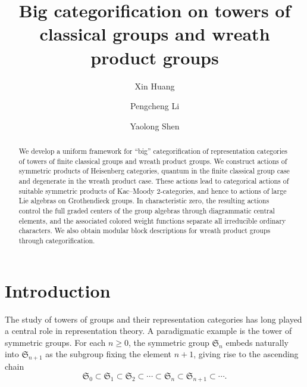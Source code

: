 \documentclass[12pt]{amsart}
\numberwithin{itemcounter}{subsection}
\theoremstyle{plain}
\theoremstyle{definition}
\theoremstyle{remark}
\numberwithin{equation}{section}
\begin{document}
	\title{Big categorification on towers of classical groups and wreath product groups}

    \author{Xin Huang}
\address[Xin Huang]{School of Mathematics and Statistics, Central China Normal University, Wuhan 430079, China}

    \author{Pengcheng Li}
\address[Pengcheng Li]{Department of Mathematics and New Cornerstone Science Laboratory, The University of Hong Kong, Hong Kong}

	\author{Yaolong Shen}
\address[Yaolong Shen]{School of Mathematical Sciences, Key Laboratory of MEA (Ministry of Education)
\& Shanghai Key Laboratory of PMMP, East China Normal University, Shanghai 200241,
China}


\begin{abstract}
We develop a uniform framework for ``big'' categorification of representation categories of towers of finite classical groups and wreath product groups. We construct actions of symmetric products of Heisenberg categories, quantum in the finite classical group case and degenerate in the wreath product case. These actions lead to categorical actions of suitable symmetric products of Kac--Moody 2-categories, and hence to actions of large Lie algebras on Grothendieck groups. In characteristic zero, the resulting actions control the full graded centers of the group algebras through diagrammatic central elements, and the associated colored weight functions separate all irreducible ordinary characters. We also obtain modular block descriptions for wreath product groups through categorification.
\end{abstract}

	\maketitle
\tableofcontents

	\pagestyle{myheadings}

	\markboth{}{}

\section{Introduction}

The study of towers of groups and their representation categories has long
played a central role in representation theory. A paradigmatic example is the
tower of symmetric groups. For each $n \geq 0$, the symmetric group
$\mathfrak S_n$ embeds naturally into $\mathfrak S_{n+1}$ as the subgroup
fixing the element $n+1$, giving rise to the ascending chain
\[
    \mathfrak S_0 \subset \mathfrak S_1 \subset \mathfrak S_2 \subset \cdots
    \subset \mathfrak S_n \subset \mathfrak S_{n+1} \subset \cdots .
\]
\end{document}

